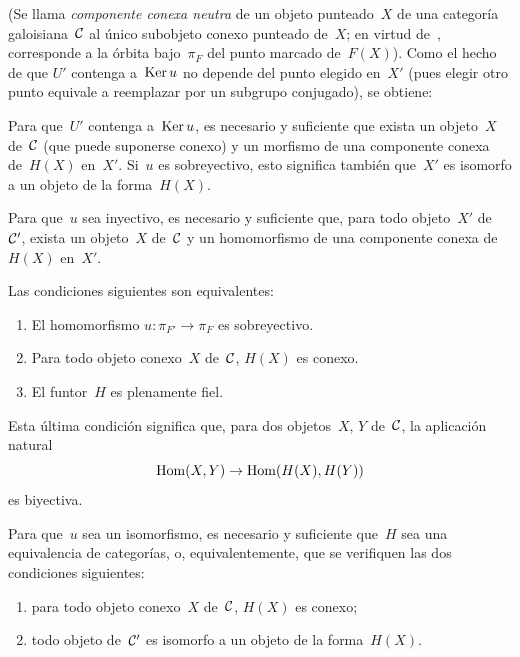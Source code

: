 (Se llama \emph{componente conexa neutra}
%
de un objeto punteado~$X$ de una categoría galoisiana~$\cal C$ al único
subobjeto conexo punteado de~$X$; en virtud de~, corresponde a
la órbita bajo~$\pi_F$ del punto marcado de~$F(X)$). Como el hecho de que
$U'$ contenga a~$\Ker u$ no depende del punto elegido en~$X'$ (pues elegir
otro punto equivale a reemplazar
por un subgrupo conjugado), se obtiene:

\begin{corollaire}
\label{V.6.7}
Para que~$U'$ contenga a~$\Ker u$, es necesario y suficiente que exista un
objeto~$X$ de~$\cal C$ (que puede suponerse conexo) y un morfismo de una
componente conexa de~$H(X)$ en~$X'$. Si~$u$ es sobreyectivo, esto significa
también que~$X'$ es isomorfo a un objeto de la forma~$H(X)$.
\end{corollaire}

\begin{corollaire}
\label{V.6.8}
Para que~$u$ sea inyectivo, es necesario y suficiente que, para todo
objeto~$X'$ de~$\cal C'$, exista un objeto~$X$ de~$\cal C$ y un
homomorfismo de una componente conexa de~$H(X)$ en~$X'$.
\end{corollaire}

\begin{proposition}
\label{V.6.9}
Las condiciones siguientes son equivalentes:
\begin{enumerate}
\item[(i)] El homomorfismo $u\colon\pi_{F'}\to\pi_F$ es sobreyectivo.
\item[(ii)] Para todo objeto conexo~$X$ de~$\cal C$, $H(X)$ es conexo.
\item[(iii)] El funtor~$H$ es plenamente fiel.
\end{enumerate}
\end{proposition}

Esta última condición significa que, para dos objetos~$X$, $Y$ de~$\cal C$,
la aplicación natural
$$
\Hom(X,Y)\to\Hom(H(X),H(Y))
$$
es biyectiva.

\begin{corollaire}
\label{V.6.10}
Para
que~$u$ sea un isomorfismo, es necesario y suficiente que~$H$ sea una
equivalencia de categorías, o, equivalentemente, que se verifiquen las dos
condiciones siguientes:
\begin{enumerate}
\item[a)] para todo objeto conexo~$X$ de~$\cal C$, $H(X)$ es conexo;
\item[b)] todo objeto de~$\cal C'$ es isomorfo a un objeto de la
forma~$H(X)$.
\end{enumerate}
\end{corollaire}

